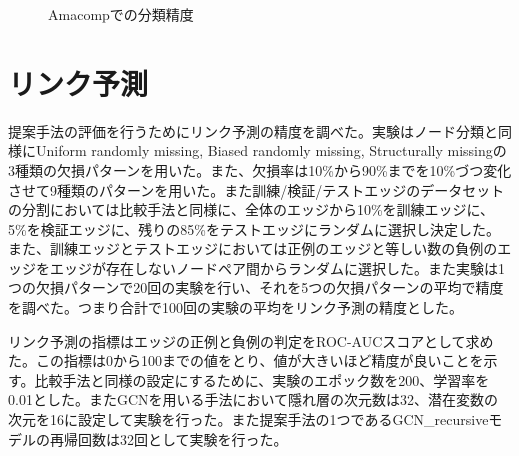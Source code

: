 \begin{figure}
	\caption{Amacompでの分類精度}
	\label{fig:rec_amacomp}
\end{figure}

\section{リンク予測}
提案手法の評価を行うためにリンク予測の精度を調べた。実験はノード分類と同様にUniform randomly missing, Biased randomly missing, Structurally missingの3種類の欠損パターンを用いた。また、欠損率は10\%から90\%までを10\%づつ変化させて9種類のパターンを用いた。また訓練/検証/テストエッジのデータセットの分割においては比較手法と同様に、全体のエッジから10\%を訓練エッジに、5\%を検証エッジに、残りの85\%をテストエッジにランダムに選択し決定した。また、訓練エッジとテストエッジにおいては正例のエッジと等しい数の負例のエッジをエッジが存在しないノードペア間からランダムに選択した。また実験は1つの欠損パターンで20回の実験を行い、それを5つの欠損パターンの平均で精度を調べた。つまり合計で100回の実験の平均をリンク予測の精度とした。

リンク予測の指標はエッジの正例と負例の判定をROC-AUCスコアとして求めた。この指標は0から100までの値をとり、値が大きいほど精度が良いことを示す。比較手法と同様の設定にするために、実験のエポック数を200、学習率を0.01とした。またGCNを用いる手法において隱れ層の次元数は32、潜在変数の次元を16に設定して実験を行った。また提案手法の1つであるGCN\_recursiveモデルの再帰回数は32回として実験を行った。

